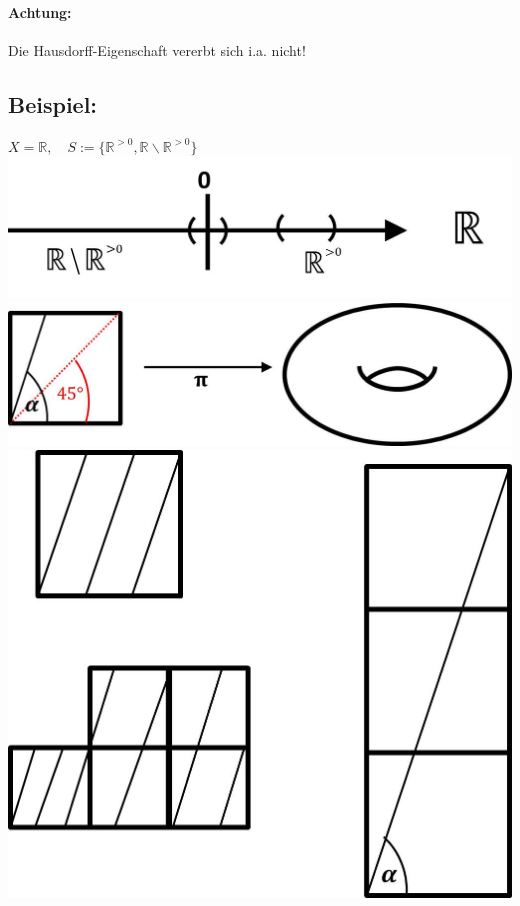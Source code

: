 \documentclass[a4paper,11pt,notitlepage]{report}
\theoremstyle{remark}
\theoremstyle{definition}
\newcommand{\R}{{\ensuremath{\mathbb{R}}}}
\newenvironment{bsp}[1]
{
\setlength{\fboxsep}{10pt}
\subsection*{Beispiel: #1}
\begin{upshape}
}
{
\end{upshape}
}
\begin{document}
\paragraph{Achtung:}
Die Hausdorff-Eigenschaft vererbt sich i.a. nicht!

\begin{bsp}{}
	$X = \R, \quad S:= \{\R^{>0}, \R \backslash \R^{>0}\}$\newline
	\includegraphics[scale=0.6]{images/Partition_R.jpg}\newline
	\includegraphics[scale=0.6]{images/Identifizierung_Linien.jpg}\newline
	\includegraphics[scale=0.6]{images/Linien_Quadrat.jpg}\newline


\end{bsp}
\end{document}
